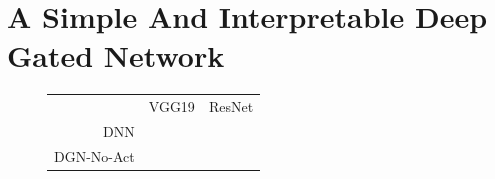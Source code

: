 \section{A Simple And Interpretable Deep Gated  Network}\label{sec:interpret}
\begin{figure}[h]
\begin{minipage}{0.4\columnwidth}
\centering
{}
\end{minipage}
\begin{minipage}{0.4\columnwidth}
\begin{tabular}{rcc}
\toprule
&VGG19 & ResNet\\
DNN& &\\
DGN-No-Act& & \\
\bottomrule
\end{tabular}
\end{minipage}
\end{figure}

